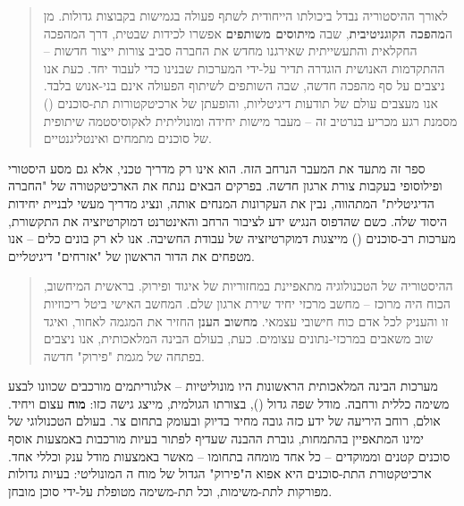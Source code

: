 

\begin{quote}
לאורך ההיסטוריה נבדל \textit{} ביכולתו הייחודית לשתף פעולה בגמישות בקבוצות גדולות. מן ה\textbf{מהפכה הקוגניטיבית}, שבה \textbf{מיתוסים משותפים} אפשרו לכידות שבטית, דרך המהפכה החקלאית והתעשייתית שאירגנו מחדש את החברה סביב צורות ייצור חדשות – ההתקדמות האנושית הוגדרה תדיר על-ידי המערכות שבנינו כדי לעבוד יחד. כעת אנו ניצבים על סף מהפכה חדשה, שבה השותפים לשיתוף הפעולה אינם בני-אנוש בלבד. אנו מעצבים עולם של תודעות דיגיטליות, והופעתן של ארכיטקטורות תת-סוכנים () מסמנת רגע מכריע בנרטיב זה – מעבר מישות \textbf{} יחידה ומונוליתית לאקוסיסטמה שיתופית של סוכנים מתמחים ואינטליגנטיים\cite{Harari2018}.
\end{quote}

ספר זה מתעד את המעבר הנרחב הזה. הוא אינו רק מדריך טכני, אלא גם מסע היסטורי ופילוסופי בעקבות צורת ארגון חדשה. בפרקים הבאים ננתח את הארכיטקטורה של "החברה הדיגיטלית" המתהווה, נבין את העקרונות המנחים אותה, ונציג מדריך מעשי לבניית יחידות היסוד שלה. כשם שהדפוס הנגיש ידע לציבור הרחב והאינטרנט דמוקרטיזציה את התקשורת, מערכות רב-סוכנים () מייצגות דמוקרטיזציה של עבודת החשיבה. אנו לא רק בונים כלים – אנו מטפחים את הדור הראשון של "אזרחים" דיגיטליים.


\begin{quote}
ההיסטוריה של הטכנולוגיה מתאפיינת במחזוריות של איגוד ופירוק. בראשית המיחשוב, הכוח היה מרוכז – מחשב מרכזי יחיד שירת ארגון שלם. המחשב האישי ביטל ריכוזיות זו והעניק לכל אדם כוח חישובי עצמאי. \textbf{מחשוב הענן} החזיר את המגמה לאחור, ואיגד שוב משאבים במרכזי-נתונים עצומים. כעת, בעולם הבינה המלאכותית, אנו ניצבים בפתחה של מגמת "פירוק" חדשה.
\end{quote}

מערכות הבינה המלאכותית הראשונות היו מונוליטיות – אלגוריתמים מורכבים שכוונו לבצע משימה כללית ורחבה. מודל שפה גדול (), בצורתו הגולמית, מייצג גישה כזו: \textbf{מוח} עצום ויחיד. אולם, רוחב היריעה של ידע כזה גובה מחיר בדיוק ובעומק בתחום צר. בעולם הטכנולוגי של ימינו המתאפיין בהתמחות, גוברת ההבנה שעדיף לפתור בעיות מורכבות באמצעות אוסף סוכנים קטנים וממוקדים – כל אחד מומחה בתחומו – מאשר באמצעות מודל ענק וכללי אחד. ארכיטקטורת התת-סוכנים היא אפוא ה"פירוק" הגדול של מוח ה המונוליטי: בעיות גדולות מפורקות לתת-משימות, וכל תת-משימה מטופלת על-ידי סוכן מובחן.

